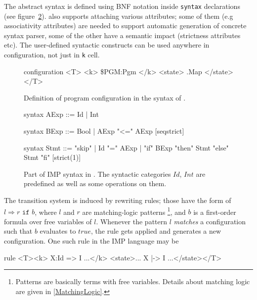 \documentclass{fithesis3}
\newcommand{\var}[1]{\mathit{#1}}
\begin{document}
The abstract syntax is defined using BNF notation inside \texttt{syntax} declarations (see figure~\ref{ImpSyntaxInK}). \K also supports attaching various attributes; some of them (e.g associativity attributes) are needed to support automatic generation of concrete syntax parser, some of the other have a semantic impact (strictness attributes etc). The user-defined syntactic constructs can be used anywhere in configuration, not just in \texttt{k} cell.

\begin{figure}
\caption{Definition of program configuration in the syntax of \K. }
\label{ImpConfigurationInK}
\begin{asciik}
configuration <T> <k> \$PGM:Pgm </k> <state> .Map </state> </T>
\end{asciik}
\end{figure}

\begin{figure}
\caption{Part of IMP syntax in \K. The syntactic categories $\var{Id}$, $\var{Int}$ are predefined as well as some operations on them. }
\label{ImpSyntaxInK}
\begin{asciik}
syntax AExp ::= Id | Int

syntax BExp  ::= Bool
| AExp "<=" AExp [seqstrict]

syntax Stmt  ::= "skip"
| Id "=" AExp
| "if" BExp "then" Stmt "else" Stmt "fi" [strict(1)]
\end{asciik}
\end{figure}






The transition system is induced by rewriting rules; those have the form of $l \Rightarrow r \texttt{ if } b$, where $l$ and $r$ are matching-logic patterns \footnote{Patterns are basically terms with free variables. Details about matching logic are given in \ref{MatchingLogic}.},
and $b$ is a first-order formula over free variables of $l$. Whenever the pattern $l$ \textit{matches} a configuration such that $b$ evaluates to $\var{true}$, the rule gets applied and generates a new configuration. One such rule in the IMP language may be
\begin{asciik}[basicstyle=\small]
rule <T><k> X:Id => I ...</k>
     <state>... X |-> I ...</state></T>
\end{asciik}
\end{document}
